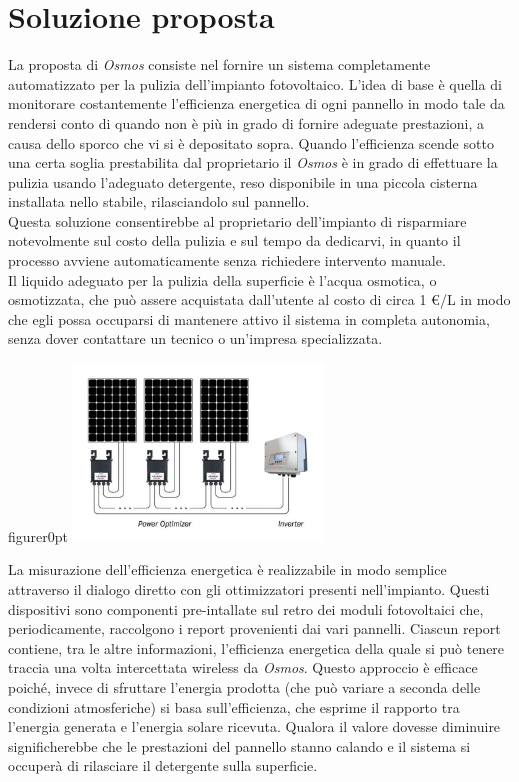 \documentclass[a4paper, 12pt]{article}
\begin{document}
	\section{Soluzione proposta}
	La proposta di \emph{Osmos} consiste nel fornire un sistema completamente automatizzato per la pulizia dell'impianto fotovoltaico. L'idea di base è quella di monitorare costantemente l'efficienza energetica di ogni pannello in modo tale da rendersi conto di quando non è più in grado di fornire adeguate prestazioni, a causa dello sporco che vi si è depositato sopra. Quando l'efficienza scende sotto una certa soglia prestabilita dal proprietario il \emph{Osmos} è in grado di effettuare la pulizia usando l'adeguato detergente, reso disponibile in una piccola cisterna installata nello stabile, rilasciandolo sul pannello.\\
	Questa soluzione consentirebbe al proprietario dell'impianto di risparmiare notevolmente sul costo della pulizia e sul tempo da dedicarvi, in quanto il processo avviene automaticamente senza richiedere intervento manuale.\\
	Il liquido adeguato per la pulizia della superficie è l'acqua osmotica, o osmotizzata, che può assere acquistata dall'utente al costo di circa 1 \euro/L in modo che egli possa occuparsi di mantenere attivo il sistema in completa autonomia, senza dover contattare un tecnico o un'impresa specializzata.\\%
	\begin{wrapfloat}{figure}{r}{0pt}
		\includegraphics[width=0.5\textwidth]{Images/ottimizzatori.jpg}
	\end{wrapfloat}
	La misurazione dell'efficienza energetica è realizzabile in modo semplice attraverso il dialogo diretto con gli ottimizzatori presenti nell'impianto. Questi dispositivi sono componenti pre-intallate sul retro dei moduli fotovoltaici che, periodicamente, raccolgono i report provenienti dai vari pannelli. Ciascun report contiene, tra le altre informazioni, l'efficienza energetica della quale si può tenere traccia una volta intercettata wireless da \emph{Osmos}. Questo approccio è efficace poiché, invece di sfruttare l'energia prodotta (che può variare a seconda delle condizioni atmosferiche) si basa sull'efficienza, che esprime il rapporto tra l'energia generata e l'energia solare ricevuta. Qualora il valore dovesse diminuire significherebbe che le prestazioni del pannello stanno calando e il sistema si occuperà di rilasciare il detergente sulla superficie.
\end{document}
